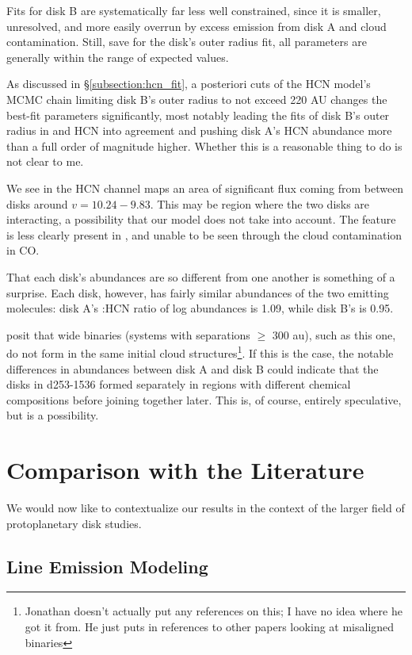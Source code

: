 Fits for disk B are systematically far less well constrained, since it is smaller, unresolved, and more easily overrun by excess emission from disk A and cloud contamination. Still, save for the disk's outer radius fit, all parameters are generally within the range of expected values.

As discussed in \S\ref{subsection:hcn_fit}, a posteriori cuts of the HCN model's MCMC chain limiting disk B's outer radius to not exceed 220 AU changes the best-fit parameters significantly, most notably leading the fits of disk B's outer radius in \hco and HCN into agreement and pushing disk A's HCN abundance more than a full order of magnitude higher. Whether this is a reasonable thing to do is not clear to me.

We see in the HCN channel maps an area of significant flux coming from between disks around $ v = 10.24-9.83$. This may be region where the two disks are interacting, a possibility that our model does not take into account. The feature is less clearly present in \hco, and unable to be seen through the cloud contamination in CO.


That each disk's abundances are so different from one another is something of a surprise. Each disk, however, has fairly similar abundances of the two emitting molecules: disk A's \hco:HCN ratio of log abundances is 1.09, while disk B's is 0.95.


\citet{Williams2014} posit that wide binaries (systems with separations $\geq$ 300 au), such as this one, do not form in the same initial cloud structures\footnote{Jonathan doesn't actually put any references on this; I have no idea where he got it from. He just puts in references to other papers looking at misaligned binaries}. If this is the case, the notable differences in abundances between disk A and disk B could indicate that the disks in d253-1536 formed separately in regions with different chemical compositions before joining together later. This is, of course, entirely speculative, but is a possibility.




\section{Comparison with the Literature}

We would now like to contextualize our results in the context of the larger field of protoplanetary disk studies.


\subsection{Line Emission Modeling}

